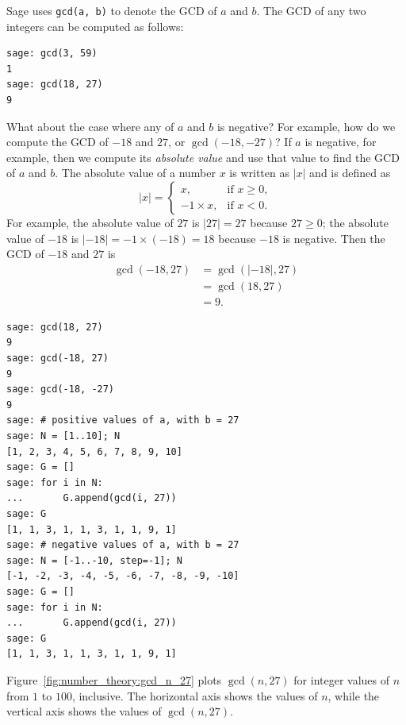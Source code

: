 Sage uses \verb!gcd(a, b)! to denote the GCD of $a$ and $b$. The GCD
of any two integers can be computed as follows:
%
\begin{lstlisting}
sage: gcd(3, 59)
1
sage: gcd(18, 27)
9
\end{lstlisting}

What about the case where any of $a$ and $b$ is negative? For example,
how do we compute the GCD of $-18$ and $27$, or $\gcd(-18, -27)$? If
$a$ is negative, for example, then we compute its
\emph{absolute value} and use that value to find the GCD of $a$ and
$b$. The absolute value of a number $x$ is written as $|x|$ and is
defined as
\[
|x|
=
\begin{cases}
x, & \text{if $x \geq 0$}, \\
-1 \times x, & \text{if $x < 0$}.
\end{cases}
\]
For example, the absolute value of $27$ is $|27| = 27$ because
$27 \geq 0$; the absolute value of $-18$ is
$|-18| = -1 \times (-18) = 18$ because $-18$ is negative. Then the GCD
of $-18$ and $27$ is
%
\begin{align*}
\gcd(-18, 27)
&=
\gcd(|-18|, 27) \\
&=
\gcd(18, 27) \\
&=
9.
\end{align*}

\begin{lstlisting}
sage: gcd(18, 27)
9
sage: gcd(-18, 27)
9
sage: gcd(-18, -27)
9
sage: # positive values of a, with b = 27
sage: N = [1..10]; N
[1, 2, 3, 4, 5, 6, 7, 8, 9, 10]
sage: G = []
sage: for i in N:
...       G.append(gcd(i, 27))
sage: G
[1, 1, 3, 1, 1, 3, 1, 1, 9, 1]
sage: # negative values of a, with b = 27
sage: N = [-1..-10, step=-1]; N
[-1, -2, -3, -4, -5, -6, -7, -8, -9, -10]
sage: G = []
sage: for i in N:
...       G.append(gcd(i, 27))
sage: G
[1, 1, 3, 1, 1, 3, 1, 1, 9, 1]
\end{lstlisting}

Figure~\ref{fig:number_theory:gcd_n_27} plots $\gcd(n, 27)$ for
integer values of $n$ from $1$ to $100$, inclusive. The horizontal
axis shows the values of $n$, while the vertical axis shows the values
of $\gcd(n, 27)$.

